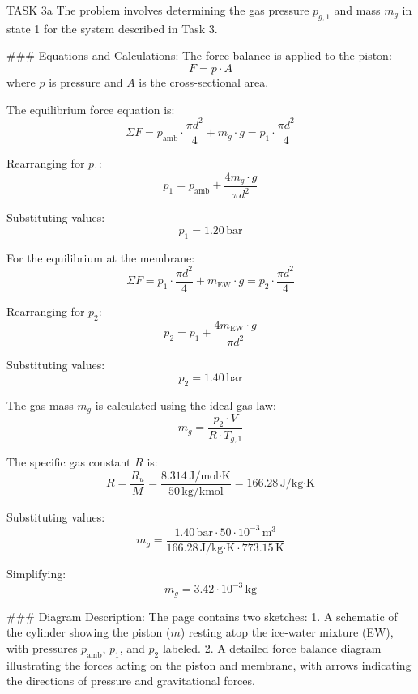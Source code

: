 TASK 3a  
The problem involves determining the gas pressure \( p_{g,1} \) and mass \( m_g \) in state 1 for the system described in Task 3.  

### Equations and Calculations:  
The force balance is applied to the piston:  
\[
F = p \cdot A
\]  
where \( p \) is pressure and \( A \) is the cross-sectional area.  

The equilibrium force equation is:  
\[
\Sigma F = p_{\text{amb}} \cdot \frac{\pi d^2}{4} + m_g \cdot g = p_1 \cdot \frac{\pi d^2}{4}
\]  

Rearranging for \( p_1 \):  
\[
p_1 = p_{\text{amb}} + \frac{4 m_g \cdot g}{\pi d^2}
\]  

Substituting values:  
\[
p_1 = 1.20 \, \text{bar}
\]  

For the equilibrium at the membrane:  
\[
\Sigma F = p_1 \cdot \frac{\pi d^2}{4} + m_{\text{EW}} \cdot g = p_2 \cdot \frac{\pi d^2}{4}
\]  

Rearranging for \( p_2 \):  
\[
p_2 = p_1 + \frac{4 m_{\text{EW}} \cdot g}{\pi d^2}
\]  

Substituting values:  
\[
p_2 = 1.40 \, \text{bar}
\]  

The gas mass \( m_g \) is calculated using the ideal gas law:  
\[
m_g = \frac{p_2 \cdot V}{R \cdot T_{g,1}}
\]  

The specific gas constant \( R \) is:  
\[
R = \frac{R_u}{M} = \frac{8.314 \, \text{J/mol·K}}{50 \, \text{kg/kmol}} = 166.28 \, \text{J/kg·K}
\]  

Substituting values:  
\[
m_g = \frac{1.40 \, \text{bar} \cdot 50 \cdot 10^{-3} \, \text{m}^3}{166.28 \, \text{J/kg·K} \cdot 773.15 \, \text{K}}
\]  

Simplifying:  
\[
m_g = 3.42 \cdot 10^{-3} \, \text{kg}
\]  

### Diagram Description:  
The page contains two sketches:  
1. A schematic of the cylinder showing the piston (\( m \)) resting atop the ice-water mixture (EW), with pressures \( p_{\text{amb}} \), \( p_1 \), and \( p_2 \) labeled.  
2. A detailed force balance diagram illustrating the forces acting on the piston and membrane, with arrows indicating the directions of pressure and gravitational forces.  

